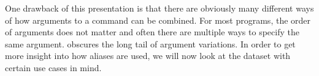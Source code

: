 One drawback of this presentation is that there are obviously many different ways of how arguments to a command can be combined.
For most programs, the order of arguments does not matter and often there are multiple ways to specify the same argument.
 obscures the long tail of argument variations.
In order to get more insight into how aliases are used, we will now look at the dataset with certain use cases in mind. 
